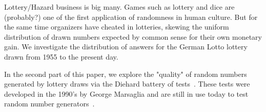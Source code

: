 Lottery/Hazard business is big many. Games such as lottery and dice are (probably?) one of the first application of randomness in human culture.
But for the same time organizers have cheated in lotteries, skewing the uniform distribution of drawn numbers expected by common sense for their
own monetary gain. We investigate the distribution of answers for the German Lotto lottery drawn from 1955 to the present day.

In the second part of this paper, we explore the "quality" of random numbers generated by lottery draws via the Diehard battery of tests~\cite{diehard}. These
tests were developed in the 1990's by George Marsaglia and are still in use today to test random number generators~\cite{modernRNG}.
